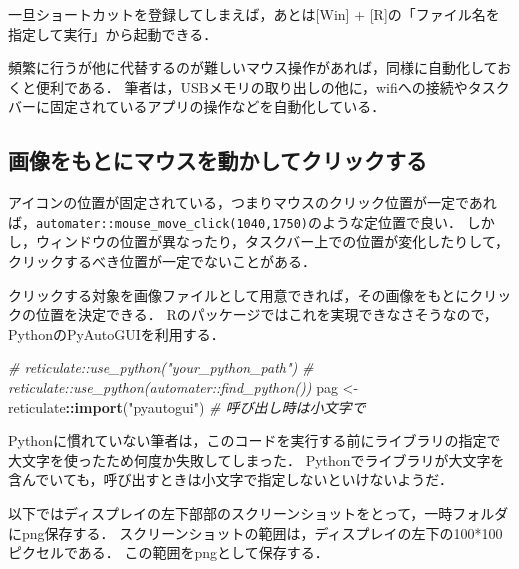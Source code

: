 \documentclass[
]{article}
\newenvironment{Shaded}{\begin{snugshade}}{\end{snugshade}}
\newcommand{\CommentTok}[1]{\textcolor[rgb]{0.56,0.35,0.01}{\textit{#1}}}
\newcommand{\FunctionTok}[1]{\textcolor[rgb]{0.13,0.29,0.53}{\textbf{#1}}}
\newcommand{\NormalTok}[1]{#1}
\newcommand{\OtherTok}[1]{\textcolor[rgb]{0.56,0.35,0.01}{#1}}
\newcommand{\SpecialCharTok}[1]{\textcolor[rgb]{0.81,0.36,0.00}{\textbf{#1}}}
\newcommand{\StringTok}[1]{\textcolor[rgb]{0.31,0.60,0.02}{#1}}
\begin{document}
一旦ショートカットを登録してしまえば，あとは{[}Win{]} + {[}R{]}の「ファイル名を指定して実行」から起動できる．

頻繁に行うが他に代替するのが難しいマウス操作があれば，同様に自動化しておくと便利である．
筆者は，USBメモリの取り出しの他に，wifiへの接続やタスクバーに固定されているアプリの操作などを自動化している．

\hypertarget{ux753bux50cfux3092ux3082ux3068ux306bux30deux30a6ux30b9ux3092ux52d5ux304bux3057ux3066ux30afux30eaux30c3ux30afux3059ux308b}{%
\subsection{画像をもとにマウスを動かしてクリックする}\label{ux753bux50cfux3092ux3082ux3068ux306bux30deux30a6ux30b9ux3092ux52d5ux304bux3057ux3066ux30afux30eaux30c3ux30afux3059ux308b}}

アイコンの位置が固定されている，つまりマウスのクリック位置が一定であれば，\texttt{automater::mouse\_move\_click(1040,1750)}のような定位置で良い．
しかし，ウィンドウの位置が異なったり，タスクバー上での位置が変化したりして，クリックするべき位置が一定でないことがある．

クリックする対象を画像ファイルとして用意できれば，その画像をもとにクリックの位置を決定できる．
Rのパッケージではこれを実現できなさそうなので，PythonのPyAutoGUIを利用する．

\begin{Shaded}
\begin{Highlighting}[]
  \CommentTok{\# reticulate::use\_python("your\_python\_path")}
  \CommentTok{\# reticulate::use\_python(automater::find\_python())}
\NormalTok{pag }\OtherTok{\textless{}{-}}\NormalTok{ reticulate}\SpecialCharTok{::}\FunctionTok{import}\NormalTok{(}\StringTok{"pyautogui"}\NormalTok{)  }\CommentTok{\# 呼び出し時は小文字で}
\end{Highlighting}
\end{Shaded}

Pythonに慣れていない筆者は，このコードを実行する前にライブラリの指定で大文字を使ったため何度か失敗してしまった．
Pythonでライブラリが大文字を含んでいても，呼び出すときは小文字で指定しないといけないようだ．

以下ではディスプレイの左下部部のスクリーンショットをとって，一時フォルダにpng保存する．
スクリーンショットの範囲は，ディスプレイの左下の100*100ピクセルである．
この範囲をpngとして保存する．
\end{document}

